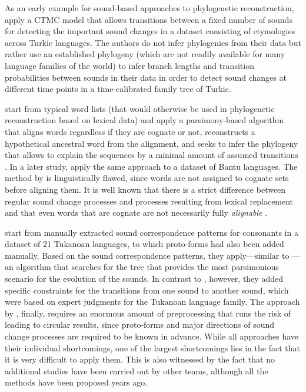 \documentclass[10pt, a4paper]{article}
\begin{document}
As an early example for sound-based approaches to phylogenetic reconstruction, \citet{hruschka2015detecting} apply a CTMC model that allows transitions between a fixed number of sounds for detecting the important sound changes in a dataset consisting of etymologies across Turkic languages. The authors do not infer phylogenies from their data but rather use an established phylogeny (which are not readily available for many language families of the world) to infer branch lengths and transition probabilities between sounds in their data in order to detect sound changes at different time points in a time-calibrated family tree of Turkic. 

\citet{Wheeler2015b} start from typical word lists (that would otherwise be used in phylogenetic reconstruction based on lexical data) and apply a parsimony-based algorithm that aligns words regardless if they are cognate or not, reconstructs a hypothetical ancestral word from the alignment, and seeks to infer the phylogeny that allows to explain the sequences by a minimal amount of assumed transitions \citep{Sankoff1975}. In a later study, \citet{Whiteley2019} apply the same approach to a dataset of Bantu languages. The method by \citet{Wheeler2015b} is linguistically flawed, since words are not assigned to cognate sets before aligning them. It is well known that there is a strict difference between regular sound change processes and processes resulting from lexical replacement \citep{Hall2010} and that even words that are cognate are not necessarily fully \emph{alignable}
\citep[10]{Schweikhard2020}.


\citet{Chacon2015a} start from manually extracted sound correspondence patterns for consonants in a dataset of 21 Tukanoan languages, to which proto-forms had also been added manually. Based on the sound correspondence patterns, they apply---similar to \citet{Wheeler2015b}---an algorithm that searches for the tree that provides the most parsimonious scenario for the evolution of the sounds. In contrast to \citet{Wheeler2015b}, however, they added specific constraints for the transitions from one sound to another sound, which were based on expert judgments for the Tukanoan language family. The approach by \citet{Chacon2015a}, finally, requires an enormous amount of preprocessing that runs the risk of leading to circular results, since proto-forms and major directions of sound change processes are required to be known in advance. While all approaches have their individual shortcomings, one of the largest shortcomings lies in the fact that it is very difficult to apply them. This is also witnessed by the fact that no additional studies have been carried out by other teams, although all the methods have been proposed years ago.
\end{document}
